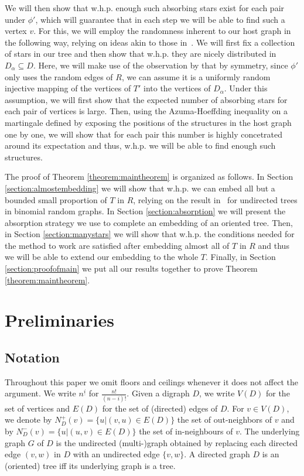 \documentclass[10pt, a4paper]{article}
\theoremstyle{remark}
\begin{document}
We will then show that w.h.p. enough such absorbing stars exist for each pair under $\phi'$, which will guarantee that in each step we will be able to find such a vertex $v$. For this, we will employ the randomness inherent to our host graph in the following way, relying on ideas akin to those in~\cite{bottcher2020embedding,undirected_spanning_universality}.
We will first fix a collection of stars in our tree and then show that w.h.p. they are nicely distributed in $D_\alpha \subseteq D$.
Here, we will make use of the observation by \cite{krivelevich_bounded-degree_2016} that by symmetry, since $\phi'$ only uses the random edges of $R$, we can assume it is a uniformly random injective mapping of the vertices of $T'$ into the vertices of $D_{\alpha}$.
Under this assumption, we will first show that the expected number of absorbing stars for each pair of vertices is large.
Then, using the Azuma-Hoeffding inequality on a martingale defined by exposing the positions of the structures in the host graph one by one, we will show that for each pair this number is highly concetrated around its expectation and thus, w.h.p. we will be able to find enough such structures.

\vspace{10pt}


The proof of Theorem \ref{theorem:maintheorem} is organized as follows.
In Section \ref{section:almostembedding} we will show that w.h.p. we can embed all but a bounded small proportion of $T$ in $R$, relying on the result in~\cite{alon_embedding_2007} for undirected trees in binomial random graphs.
In Section \ref{section:absorption} we will present the absorption strategy we use to complete an embedding of an oriented tree.
Then, in Section \ref{section:manystars} we will show that w.h.p. the conditions needed for the method to work are satisfied after embedding almost all of $T$ in $R$ and thus we will be able to extend our embedding to the whole $T$.
Finally, in Section \ref{section:proofofmain} we put all our results together to prove Theorem \ref{theorem:maintheorem}.

\section{Preliminaries}
\subsection*{Notation}
Throughout this paper we omit floors and ceilings whenever it does not affect the argument.
We write $n^{\underline{i}}$ for $\frac{n!}{(n-i)!}$.
Given a digraph $D$, we write $V(D)$ for the set of vertices and $E(D)$ for the set of (directed) edges of $D$.
For $v \in V(D)$, we denote by $N_D^+(v) = \{u | (v, u) \in E(D)\}$ the set of out-neighbors of $v$ and by $N_D^-(v) = \{u | (u, v) \in E(D)\}$ the set of in-neighbours of $v$.
The underlying graph $G$ of $D$ is the undirected (multi-)graph obtained by replacing each directed edge $(v, w)$ in $D$ with an undirected edge $\{v, w\}$.
A directed graph $D$ is an (oriented) tree iff its underlying graph is a tree.
\end{document}
